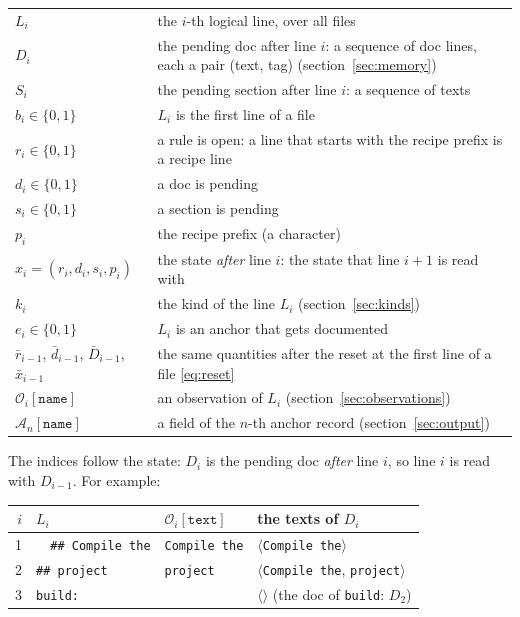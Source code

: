 \documentclass[11pt]{article}
\newcommand{\code}[1]{\mbox{\texttt{#1}}}
\newcommand{\field}[1]{\texttt{#1}}
\newcommand{\Obs}[1]{\mathcal{O}_i[\field{#1}]}
\newcommand{\emptyseq}{\langle\rangle}
\begin{document}
\begin{center}
\begin{tabular}{@{}lP{0.68\textwidth}@{}}
  \toprule
  $L_i$ & the $i$-th logical line, over all files \\
  $D_i$ & the pending doc after line $i$: a sequence of doc lines, each a pair (text, tag)
          (section~\ref{sec:memory}) \\
  $S_i$ & the pending section after line $i$: a sequence of texts \\
  \midrule
  $b_i \in \{0,1\}$ & $L_i$ is the first line of a file \\
  $r_i \in \{0,1\}$ & a rule is open: a line that starts with the recipe prefix is a recipe line \\
  $d_i \in \{0,1\}$ & a doc is pending \\
  $s_i \in \{0,1\}$ & a section is pending \\
  $p_i$ & the recipe prefix (a character) \\
  $x_i = (r_i, d_i, s_i, p_i)$ & the state \emph{after} line $i$: the state that line
                                 $i+1$ is read with \\
  $k_i$ & the kind of the line $L_i$ (section~\ref{sec:kinds}) \\
  $e_i \in \{0,1\}$ & $L_i$ is an anchor that gets documented \\
  $\bar r_{i-1}$, $\bar d_{i-1}$, $\bar D_{i-1}$, $\bar x_{i-1}$ & the same quantities after
      the reset at the first line of a file \eqref{eq:reset} \\
  $\mathcal{O}_i[\field{name}]$ & an observation of $L_i$ (section~\ref{sec:observations}) \\
  $\mathcal{A}_n[\field{name}]$ & a field of the $n$-th anchor record
                                  (section~\ref{sec:output}) \\
  \bottomrule
\end{tabular}
\end{center}

\noindent The indices follow the state: $D_i$ is the pending doc \emph{after} line $i$, so
line $i$ is read with $D_{i-1}$. For example:

\begin{center}
\begin{tabular}{@{}rlll@{}}
  \toprule
  $i$ & $L_i$ & $\Obs{text}$ & the texts of $D_i$ \\
  \midrule
  1 & \code{\ \ \#\# Compile the} & \code{Compile the} & $\langle$\code{Compile the}$\rangle$ \\
  2 & \code{\#\# project} & \code{project} &
      $\langle$\code{Compile the}, \code{project}$\rangle$ \\
  3 & \code{build:} & & $\emptyseq$ (the doc of \code{build}: $D_2$) \\
  \bottomrule
\end{tabular}
\end{center}
\end{document}
